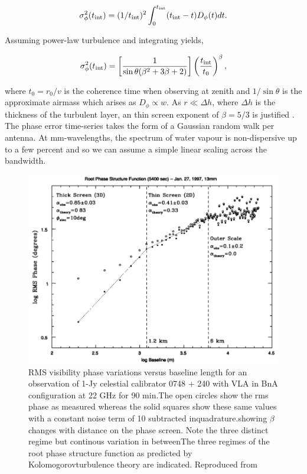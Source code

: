 \begin{equation}
\sigma^2_{\phi}(t_{\rm int}) = (1/t_{\rm int})^2 \int_{0}^{t_{\rm int}} (t_{\rm int}-t) D_{\phi}(t) dt.
\end{equation}

Assuming power-law turbulence and integrating yields, 

\begin{equation}
\sigma^2_\phi (t_{\rm int})=\left[\frac{1}{\sin\theta(\beta^2 +3\beta +2)}\right]\left(\frac{t_{\rm int}}{t_0}\right)^{\beta},
\end{equation}


\noindent where $t_0 = r_0/v$ is the coherence time when observing at zenith and $1/\sin\theta$ is the approximate airmass which arises as $D_\phi \propto w$. As $r \ll \Delta h$, where $\Delta h$ is the thickness of the turbulent layer, an thin screen exponent of $\beta = 5/3$ is justified \citep*{Treuhaft_1987}. The phase error time-series takes the form of a Gaussian random walk per antenna. At mm-wavelengths, the spectrum of water vapour is non-dispersive up to a few percent \citep{Curtis_2009} and so we can assume a simple linear scaling across the bandwidth.



\begin{figure}
\begin{center}
\includegraphics[width=\columnwidth]{Images/screentransition}
\caption{RMS visibility phase variations versus baseline length for an observation of  1-Jy celestial calibrator 0748 + 240 with VLA in BnA configuration at 22 GHz for 90 min.The open circles show the rms phase as measured whereas the solid squares show these same values with a constant noise term of 10 subtracted inquadrature.showing $\beta$ changes with distance on the phase screen. Note the three distinct regime but continous variation in betweenThe three regimes of the root phase structure function as predicted by Kolomogorovturbulence theory are indicated. Reproduced from \citet{carilli_1997} \label{fig:screentransition}
}
\end{center}
\end{figure}


